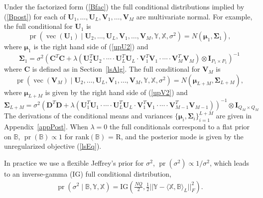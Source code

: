 \documentclass[12pt]{article}
\def\I{\mathbf{I}}
\def\U{\mathbf{U}}
\def\XX{\mathbb{X}}
\def\YY{\mathbb{Y}}
\def\V{\mathbf{V}}
\def\BB{\mathbb{B}}
\def\C{\mathbf{C}}
\def\D{\mathbf{D}}
\def\mmu{\boldsymbol{\mu}}
\def\SSigma{\boldsymbol{\Sigma}}
\newcommand{\tprod}[3] {
  \langle #1, #2 \rangle_{#3}}
\DeclareMathOperator*{\vect}{vec}
\DeclareMathOperator*{\pr}{pr}
\begin{document}
Under the factorized form (\ref{Bfac}) the full conditional distributions implied by (\ref{Bpost}) for each of $\U_1,\hdots,\U_L, \V_1,\hdots,\V_M$ are multivariate normal.  For example, the full conditional for $\U_1$ is 
\[\pr(\vect(\U_1) \mid \U_2, \hdots,\U_L, \V_1,\hdots,\V_M, \YY, \XX, \sigma^2) = N(\mmu_1, \SSigma_1),\]
where $\mmu_1$ is the right hand side of (\ref{upU2}) and 
\[\SSigma_1 = \sigma^2 \left(\C^T\C + \lambda (\U_2^T \U_2 \cdot \cdots \cdot \U_L^T \U_L \cdot \V_1^T \V_1 \cdot \cdots \cdot  \V_M^T \V_M) \otimes \mathbf{I}_{P_1 \times P_1}    \right)^{-1}\]
where $\C$ is defined as in Section~\ref{lsAlg}.  The full conditional for $\V_M$ is 
\[\pr(\vect(\V_M) \mid \U_2, \hdots,\U_L, \V_1,\hdots,\V_M, \YY, \XX, \sigma^2) = N(\mmu_{L+M}, \SSigma_{L+M}),\]
where $\mmu_{L+M}$ is given by the right hand side of (\ref{upV2}) and 
\[\SSigma_{L+M} = \sigma^2 (\D^T \D + \lambda (\U_1^T\U_1 \cdot \cdots \cdot \U_L^T\U_L \cdot \V_1^T \V_1 \cdot \cdots \cdot \V_{M-1}^T \V_{M-1}))^{-1} \otimes \I_{Q_M \times Q_M}\]
The derivations of the conditional means and variances $\{\mmu_i,\SSigma_i\}_{i=1}^{L+M}$ are given in Appendix~\ref{appPost}.  When $\lambda=0$ the full conditionals correspond to a flat prior on $\BB$, $\pr(\BB) \propto 1$ for rank$(\BB)$ = R, and the posterior mode is given by the unregularized objective (\ref{lsEq}).

In practice we use a flexible Jeffrey's prior for $\sigma^2$, $\pr(\sigma^2) \propto 1/ \sigma^2$, which leads to an inverse-gamma (IG) full conditional distribution, 
\begin{align}
\pr(\sigma^2 \mid \BB, \YY, \XX) = \mbox{IG}\left(\frac{NQ}{2} , \frac{1}{2} ||\YY- \tprod{\XX}{\BB}{L}||_F^2\right). \label{postSig2}	
\end{align}
\end{document}

